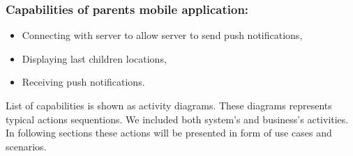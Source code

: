 \documentclass{sprawozdanie-agh}
\begin{document}
			\subsubsection{Capabilities of parents mobile application:}

			\begin{itemize}
				\item Connecting with server to allow server to send push notifications,
				\item Displaying last children locations,
				\item Receiving push notifications.
			\end{itemize}


			List of capabilities is shown as activity diagrams. These diagrams represents typical actions sequentions. We included both system's and business's activities. In following sections these actions will be presented in form of use cases and scenarios. 
\end{document}
